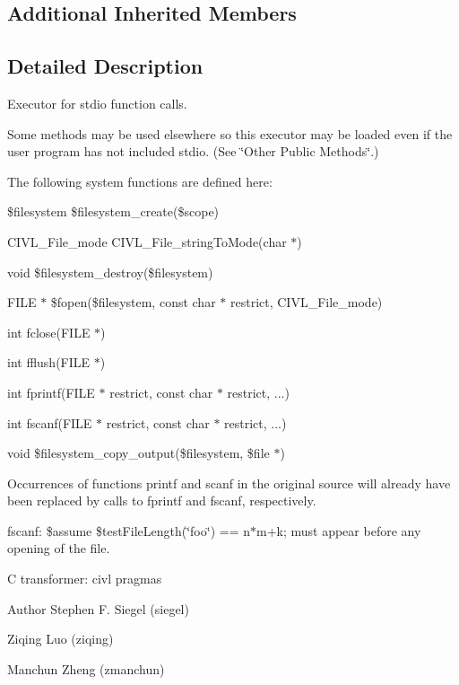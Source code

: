 \subsection*{Additional Inherited Members}


\subsection{Detailed Description}
Executor for stdio function calls. 

Some methods may be used elsewhere so this executor may be loaded even if the user program has not included stdio. (See \char`\"{}\+Other Public Methods\char`\"{}.)

The following system functions are defined here\+: 
\begin{DoxyItemize}
\item {\ttfamily \$filesystem \$filesystem\+\_\+create(\$scope)} 
\item {\ttfamily C\+I\+V\+L\+\_\+\+File\+\_\+mode C\+I\+V\+L\+\_\+\+File\+\_\+string\+To\+Mode(char $\ast$)} 
\item {\ttfamily void \$filesystem\+\_\+destroy(\$filesystem)} 
\item {\ttfamily F\+I\+L\+E $\ast$ \$fopen(\$filesystem, const char $\ast$ restrict, C\+I\+V\+L\+\_\+\+File\+\_\+mode)}  
\item {\ttfamily int fclose(\+F\+I\+L\+E $\ast$)} 
\item {\ttfamily int fflush(\+F\+I\+L\+E $\ast$)} 
\item {\ttfamily int fprintf(F\+I\+L\+E $\ast$ restrict, const char $\ast$ restrict, ...)} 
\item {\ttfamily int fscanf(F\+I\+L\+E $\ast$ restrict, const char $\ast$ restrict, ...)} 
\item {\ttfamily void \$filesystem\+\_\+copy\+\_\+output(\$filesystem, \$file $\ast$)} 
\end{DoxyItemize}

Occurrences of functions {\ttfamily printf} and {\ttfamily scanf} in the original source will already have been replaced by calls to {\ttfamily fprintf} and {\ttfamily fscanf}, respectively.

fscanf\+: \$assume \$test\+File\+Length(\char`\"{}foo\char`\"{}) == n$\ast$m+k; must appear before any opening of the file.

C transformer\+: civl pragma\textquotesingle{}s

\begin{DoxyAuthor}{Author}
Stephen F. Siegel (siegel) 

Ziqing Luo (ziqing) 

Manchun Zheng (zmanchun) 
\end{DoxyAuthor}


